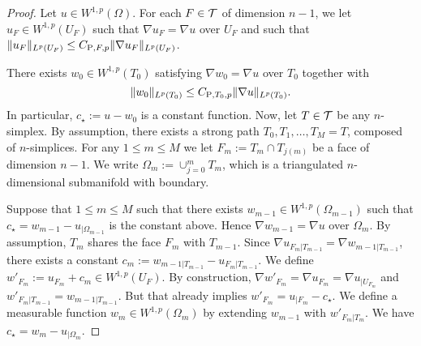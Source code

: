 \documentclass[a4paper]{article}
\begin{document}
\begin{proof}
 Let $u \in W^{1,p}(\Omega)$. 
 For each $F \in {\mathcal T}$ of dimension $n-1$, 
 we let $u_F \in W^{1,p}(U_F)$ such that $\nabla u_F = \nabla u$ over $U_F$ and such that $\| u_F \|_{L^{p}(U_F)} \leq C_{{\rm{P}},F,p} \| \nabla u_F \|_{L^{p}(U_F)}$.
 
 There exists $w_0 \in W^{1,p}(T_{0})$ satisfying $\nabla w_0 = \nabla u$ over $T_{0}$ together with 
 \[
    \| w_0 \|_{L^{p}(T_{0})} \leq C_{{\rm{P}},T_{0},p} \| \nabla u \|_{L^{p}(T_{0})}.
 \]
 In particular, $c_{\star} := u - w_0$ is a constant function. 
 Now, let $T \in {\mathcal T}$ be any $n$-simplex. 
 By assumption, there exists a strong path $T_0, T_1, \dots, T_M = T$, composed of $n$-simplices. 
 For any $1 \leq m \leq M$ we let $F_m := T_m \cap T_{j(m)}$ be a face of dimension $n-1$. 
 We write $\Omega_m := \cup_{j=0}^{m} T_m$, which is a triangulated $n$-dimensional submanifold with boundary.
 
 
 Suppose that $1 \leq m \leq M$ such that there exists $w_{m-1} \in W^{1,p}(\Omega_{m-1})$ 
 such that $c_{\star} = w_{m-1} - u_{|\Omega_{m-1}}$ is the constant above. 
 Hence $\nabla w_{m-1} = \nabla u$ over $\Omega_m$. 
 By assumption, $T_{m}$ shares the face $F_{m}$ with $T_{{m-1}}$. 
 Since $\nabla u_{F_{m}|T_{{m-1}}} = \nabla w_{m-1|T_{{m-1}}}$,
 there exists a constant $c_{m} := w_{m-1|T_{{m-1}}} - u_{F_{m}|T_{{m-1}}}$.
 We define $w'_{F_m} := u_{F_m} + c_{m} \in W^{1,p}(U_F)$.
 By construction, $\nabla w'_{F_m} = \nabla u_{F_m} = \nabla u_{|U_{F_m}}$ 
 and 
 $w'_{F_{m}|T_{{m-1}}} = w_{m-1|T_{{m-1}}}$. 
 But that already implies $w'_{F_m} = u_{|F_m} - c_{\star}$. 
 We define a measurable function $w_{m} \in W^{1,p}(\Omega_m)$ by extending $w_{m-1}$ with $w'_{F_m|T_m}$.
 We have $c_{\star} = w_{m} - u_{|\Omega_{m}}$. 
 

\end{proof}
\end{document}
